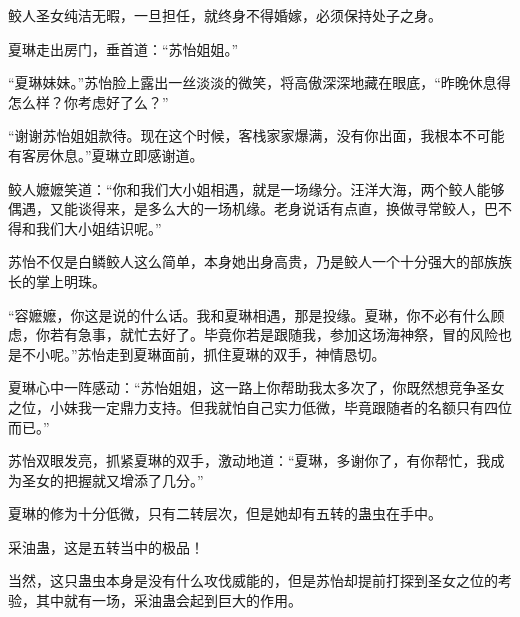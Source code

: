 \begin{this_body}
鲛人圣女纯洁无暇，一旦担任，就终身不得婚嫁，必须保持处子之身。

夏琳走出房门，垂首道：“苏怡姐姐。”

“夏琳妹妹。”苏怡脸上露出一丝淡淡的微笑，将高傲深深地藏在眼底，“昨晚休息得怎么样？你考虑好了么？”

“谢谢苏怡姐姐款待。现在这个时候，客栈家家爆满，没有你出面，我根本不可能有客房休息。”夏琳立即感谢道。

鲛人嬷嬷笑道：“你和我们大小姐相遇，就是一场缘分。汪洋大海，两个鲛人能够偶遇，又能谈得来，是多么大的一场机缘。老身说话有点直，换做寻常鲛人，巴不得和我们大小姐结识呢。”

苏怡不仅是白鳞鲛人这么简单，本身她出身高贵，乃是鲛人一个十分强大的部族族长的掌上明珠。

“容嬷嬷，你这是说的什么话。我和夏琳相遇，那是投缘。夏琳，你不必有什么顾虑，你若有急事，就忙去好了。毕竟你若是跟随我，参加这场海神祭，冒的风险也是不小呢。”苏怡走到夏琳面前，抓住夏琳的双手，神情恳切。

夏琳心中一阵感动：“苏怡姐姐，这一路上你帮助我太多次了，你既然想竞争圣女之位，小妹我一定鼎力支持。但我就怕自己实力低微，毕竟跟随者的名额只有四位而已。”

苏怡双眼发亮，抓紧夏琳的双手，激动地道：“夏琳，多谢你了，有你帮忙，我成为圣女的把握就又增添了几分。”

夏琳的修为十分低微，只有二转层次，但是她却有五转的蛊虫在手中。

采油蛊，这是五转当中的极品！

当然，这只蛊虫本身是没有什么攻伐威能的，但是苏怡却提前打探到圣女之位的考验，其中就有一场，采油蛊会起到巨大的作用。

\end{this_body}

